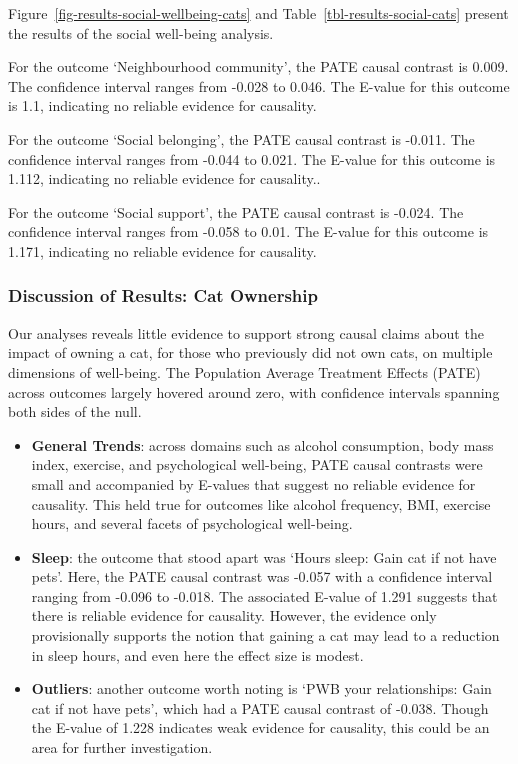 \documentclass[
  singlecolumn,
  9pt]{article}
\begin{document}
Figure~\ref{fig-results-social-wellbeing-cats} and
Table~\ref{tbl-results-social-cats} present the results of the social
well-being analysis.

For the outcome `Neighbourhood community', the PATE causal contrast is
0.009. The confidence interval ranges from -0.028 to 0.046. The E-value
for this outcome is 1.1, indicating no reliable evidence for causality.

For the outcome `Social belonging', the PATE causal contrast is -0.011.
The confidence interval ranges from -0.044 to 0.021. The E-value for
this outcome is 1.112, indicating no reliable evidence for causality..

For the outcome `Social support', the PATE causal contrast is -0.024.
The confidence interval ranges from -0.058 to 0.01. The E-value for this
outcome is 1.171, indicating no reliable evidence for causality.

\subsubsection{Discussion of Results: Cat
Ownership}\label{discussion-of-results-cat-ownership}

Our analyses reveals little evidence to support strong causal claims
about the impact of owning a cat, for those who previously did not own
cats, on multiple dimensions of well-being. The Population Average
Treatment Effects (PATE) across outcomes largely hovered around zero,
with confidence intervals spanning both sides of the null.

\begin{itemize}
\item
  \textbf{General Trends}: across domains such as alcohol consumption,
  body mass index, exercise, and psychological well-being, PATE causal
  contrasts were small and accompanied by E-values that suggest no
  reliable evidence for causality. This held true for outcomes like
  alcohol frequency, BMI, exercise hours, and several facets of
  psychological well-being.
\item
  \textbf{Sleep}: the outcome that stood apart was `Hours sleep: Gain
  cat if not have pets'. Here, the PATE causal contrast was -0.057 with
  a confidence interval ranging from -0.096 to -0.018. The associated
  E-value of 1.291 suggests that there is reliable evidence for
  causality. However, the evidence only provisionally supports the
  notion that gaining a cat may lead to a reduction in sleep hours, and
  even here the effect size is modest.
\item
  \textbf{Outliers}: another outcome worth noting is `PWB your
  relationships: Gain cat if not have pets', which had a PATE causal
  contrast of -0.038. Though the E-value of 1.228 indicates weak
  evidence for causality, this could be an area for further
  investigation.
\end{itemize}
\end{document}
